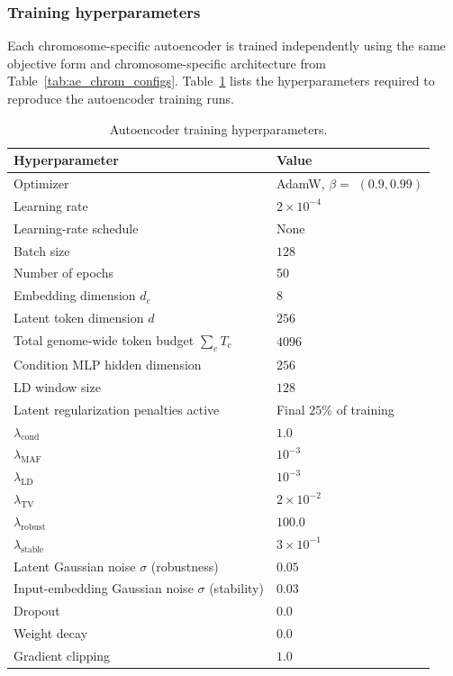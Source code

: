\documentclass{article}
\begin{document}
\subsubsection{Training hyperparameters}

Each chromosome-specific autoencoder is trained independently using the same objective form and chromosome-specific architecture from Table~\ref{tab:ae_chrom_configs}. Table~\ref{tab:ae_hyperparams} lists the hyperparameters required to reproduce the autoencoder training runs.

\begin{table}[t]
\centering
\caption{Autoencoder training hyperparameters.}
\label{tab:ae_hyperparams}
\small
\setlength{\tabcolsep}{5pt}
\renewcommand{\arraystretch}{0.95}
\begin{tabular}{ll}
\toprule
Hyperparameter & Value \\
\midrule
Optimizer & AdamW, \(\beta=\) \((0.9,0.99)\) \\
Learning rate & \(2\times 10^{-4}\) \\
Learning-rate schedule & None \\
Batch size & \(128\) \\
Number of epochs & 50 \\
Embedding dimension \(d_e\) & \(8\) \\
Latent token dimension \(d\) & \(256\) \\
Total genome-wide token budget \(\sum_c T_c\) & \(4096\) \\
Condition MLP hidden dimension & \(256\) \\
LD window size & \(128\) \\
Latent regularization penalties active & Final \(25\)\% of training \\
\(\lambda_{\mathrm{cond}}\) & \(1.0\) \\
\(\lambda_{\mathrm{MAF}}\) & \(10^{-3}\) \\
\(\lambda_{\mathrm{LD}}\) & \(10^{-3}\) \\
\(\lambda_{\mathrm{TV}}\) & \(2\times 10^{-2}\) \\
\(\lambda_{\mathrm{robust}}\) & \(100.0\) \\
\(\lambda_{\mathrm{stable}}\) & \(3\times 10^{-1}\) \\
Latent Gaussian noise $\sigma$ (robustness) & \(0.05\) \\
Input-embedding Gaussian noise $\sigma$ (stability) & \(0.03\) \\
Dropout & \(0.0\) \\
Weight decay & \(0.0\) \\
Gradient clipping & \(1.0\) \\
\bottomrule
\end{tabular}
\end{table}
\end{document}
